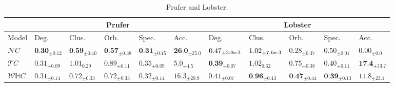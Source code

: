 \begin{table}[]
\label{graph_gen_table}
\begin{scriptsize}
\begin{center}
\begin{tabular}{lllllllllll}
    \toprule
     & \multicolumn{5}{c}{Prufer} &  \multicolumn{5}{c}{Lobster} \\
    
    \midrule
    Model   & Deg. & Clus. & Orb. & Spec. & Acc. & Deg. & Clus. & Orb. & Spec. & Acc.\\
    \midrule
    $\mathcal{N}C$ &$\textbf{0.30}_{\pm0.12}$ & $\textbf{0.59}_{\pm0.40}$& $\textbf{0.57}_{\pm0.38}$& $\textbf{0.31}_{\pm0.15}$ & $\textbf{26.0}_{\pm25.0}$ & $0.47_{\pm3.0\textnormal{e-3}}$ & $1.02_{\pm7.6\textnormal{e-3}}$& $0.28_{\pm0.37}$& $0.50_{\pm0.01}$ & $0.00_{\pm0.0}$  \\
    $\mathcal{T}C$ & $0.31_{\pm0.09}$ & $1.01_{0.29}$& $0.89_{\pm0.11}$& $0.35_{\pm0.09}$ & $5.0_{\pm4.5}$ & $\textbf{0.39}_{\pm0.07}$ & $1.02_{0.62}$& $0.75_{\pm0.38}$& $0.40_{\pm0.11}$ & $\textbf{17.4}_{\pm33.7}$\\
    $\mathcal{W}\mathbb{H}C$ & $0.31_{\pm0.14}$ & $0.72_{\pm0.33}$&  $0.72_{\pm0.33}$& $0.32_{\pm0.14}$ & $16.3_{\pm20.9}$ & $0.41_{\pm0.07}$ & $\textbf{0.96}_{\pm0.43}$& $\textbf{0.47}_{\pm0.44}$& $\textbf{0.39}_{\pm0.13}$ & $11.8_{\pm23.1}$\\
    \bottomrule
\end{tabular}
\end{center}
\caption{Prufer and Lobster.}
\vskip -0.1in
\end{scriptsize}
\end{table}
